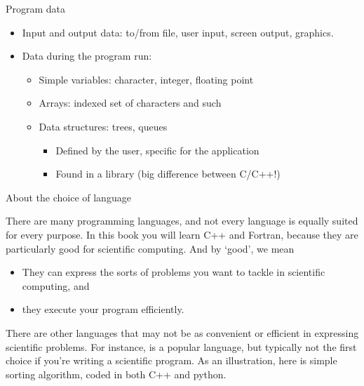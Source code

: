 \begin{block}{Program data}
  \label{sl:prog-data}
  \begin{itemize}
  \item Input and output data: to/from file, user input, screen
    output, graphics.
  \item Data during the program run:
    \begin{itemize}
    \item Simple variables: character, integer, floating point
    \item Arrays: indexed set of characters and such
    \item Data structures: trees, queues
      \begin{itemize}
      \item Defined by the user, specific for the application
      \item Found in a library (big difference between C/C++!)
      \end{itemize}
    \end{itemize}
  \end{itemize}
\end{block}


 {About the choice of language}

There are many programming languages, and not every language is
equally suited for every purpose. In this book you will learn C++ and
Fortran, because they are particularly good for scientific computing.
And by `good', we mean
\begin{itemize}
\item They can express the sorts of problems you want to tackle in
  scientific computing, and
\item they execute your program efficiently.
\end{itemize}

There are other languages that may not be as convenient or efficient
in expressing scientific problems. For instance,  is
a popular language, but typically not the first choice if you're
writing a scientific program. As an illustration, here is simple
sorting algorithm, coded in both C++ and python.

